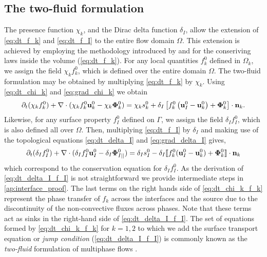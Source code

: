 \subsection{The two-fluid formulation}
The presence function $\chi_k$, and the Dirac delta function $\delta_I$, allow the extension of \ref{eq:dt_f_k} and \ref{eq:dt_f_I} to the entire flow domain $\Omega$. 
This extension is achieved by employing the methodology introduced by \citet{drew1983mathematical} and \citet{kataoka1986local} for the conseriving laws inside the volume (\ref{eq:dt_f_k}).
For any local quantities $f_k^0$ defined in $\Omega_k$, we assign the field $\chi_k f_k^0$, which is defined over the entire domain $\Omega$. The two-fluid formulation may be obtained by multiplying \ref{eq:dt_f_k} by $\chi_k$. 
Using \ref{eq:dt_chi_k} and \ref{eq:grad_chi_k} we obtain
\begin{equation}
    \partial_t (\chi_k f_k^0)
    + \mathbf{\nabla}\cdot (
        \chi_k f_k^0 \textbf{u}_k^0
        - \chi_k \mathbf{\Phi}_k^0 
        )
    = 
    \chi_k s_k^0
    + \delta_I\left[
        f_k^0
        \left(
            \textbf{u}_I^0
            - \textbf{u}_k^0
        \right)
        + \mathbf{\Phi}_k^0
    \right]
    \cdot \textbf{n}_k.
    \label{eq:dt_chi_k_f_k}
\end{equation}
Likewise, for any surface property $f_I^0$ defined on $\Gamma$, we assign the field $\delta_I f_I^0$, which is also defined all over $\Omega$. 
Then, multiplying \ref{eq:dt_f_I} by $\delta_I$ and making use of the topological equations \ref{eq:dt_delta_I} and \ref{eq:grad_delta_I} gives,
\begin{equation}
    \partial_t (\delta_If_I^0)  
    + \mathbf{\nabla}\cdot (
        \delta_I f_I^0 \textbf{u}_I^0
        - \delta_I \mathbf{\Phi}_{I||}^0 
        )
    = 
    \delta_Is_I^0
    - \delta_I\llbracket 
    f_k^0 (\textbf{u}_I^0 - \textbf{u}_k^0)
    + \mathbf{\Phi}_k^0 \rrbracket \cdot \textbf{n}_k 
    \label{eq:dt_delta_I_f_I}
\end{equation}
which correspond to the conservation equation for $\delta_If_I^0$.
As the derivation of \ref{eq:dt_delta_I_f_I} is not straightforward we provide intermediate steps in \ref{ap:interface_proof}. 
The last terms on the right hands side of \ref{eq:dt_chi_k_f_k} represent the phase transfer of $f_k$ across the interfaces and the source due to the discontinuity of the non-convective fluxes across phases.
Note that these terms act as sinks in the right-hand side of \ref{eq:dt_delta_I_f_I}. 
The set of equations formed by \ref{eq:dt_chi_k_f_k} for $k =1,2$ to which we add the surface transport equation or \textit{jump condition} (\ref{eq:dt_delta_I_f_I}) is commonly known as the \textit{two-fluid} formulation of multiphase flows \citep{morel2015mathematical,tryggvason2011direct,drew1983mathematical,kataoka1986local}. 


